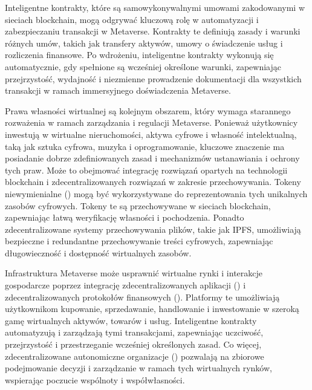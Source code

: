 Inteligentne kontrakty, które są samowykonywalnymi umowami zakodowanymi w sieciach blockchain, mogą odgrywać kluczową rolę w automatyzacji i zabezpieczaniu transakcji w Metaverse. Kontrakty te definiują zasady i warunki różnych umów, takich jak transfery aktywów, umowy o świadczenie usług i rozliczenia finansowe. Po wdrożeniu, inteligentne kontrakty wykonują się automatycznie, gdy spełnione są wcześniej określone warunki, zapewniając przejrzystość, wydajność i niezmienne prowadzenie dokumentacji dla wszystkich transakcji w ramach immersyjnego doświadczenia Metaverse\cite{metaverseInfrastructureIEEE}.

Prawa własności wirtualnej są kolejnym obszarem, który wymaga starannego rozważenia w ramach zarządzania i regulacji Metaverse. Ponieważ użytkownicy inwestują w wirtualne nieruchomości, aktywa cyfrowe i własność intelektualną, taką jak sztuka cyfrowa, muzyka i oprogramowanie, kluczowe znaczenie ma posiadanie dobrze zdefiniowanych zasad i mechanizmów ustanawiania i ochrony tych praw. Może to obejmować integrację rozwiązań opartych na technologii blockchain i zdecentralizowanych rozwiązań w zakresie przechowywania. Tokeny niewymienialne  () mogą być wykorzystywane do reprezentowania tych unikalnych zasobów cyfrowych. Tokeny te są przechowywane w sieciach blockchain, zapewniając łatwą weryfikację własności i pochodzenia. Ponadto zdecentralizowane systemy przechowywania plików, takie jak IPFS, umożliwiają bezpieczne i redundantne przechowywanie treści cyfrowych, zapewniając długowieczność i dostępność wirtualnych zasobów\cite{metaverseInfrastructureIEEE}.

Infrastruktura Metaverse może usprawnić wirtualne rynki i interakcje gospodarcze poprzez integrację zdecentralizowanych aplikacji  () i zdecentralizowanych protokołów finansowych  (). Platformy te umożliwiają użytkownikom kupowanie, sprzedawanie, handlowanie i inwestowanie w szeroką gamę wirtualnych aktywów, towarów i usług. Inteligentne kontrakty automatyzują i zarządzają tymi transakcjami, zapewniając uczciwość, przejrzystość i przestrzeganie wcześniej określonych zasad. Co więcej, zdecentralizowane autonomiczne organizacje  () pozwalają na zbiorowe podejmowanie decyzji i zarządzanie w ramach tych wirtualnych rynków, wspierając poczucie wspólnoty i współwłasności\cite{metaverseInfrastructureIEEE}.

